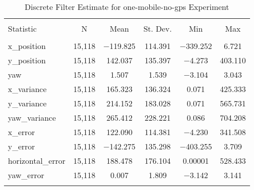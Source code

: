
\begin{table}[h] \centering 
  \caption{Discrete Filter Estimate for one-mobile-no-gps Experiment} 
  \label{tab:one_mobile_no_gps_discrete_summary} 
\begin{tabular}{@{\extracolsep{5pt}}lccccc} 
\\[-1.8ex]\hline 
\hline \\[-1.8ex] 
Statistic & \multicolumn{1}{c}{N} & \multicolumn{1}{c}{Mean} & \multicolumn{1}{c}{St. Dev.} & \multicolumn{1}{c}{Min} & \multicolumn{1}{c}{Max} \\ 
\hline \\[-1.8ex] 
x\_position & 15,118 & $-$119.825 & \num{114.391} & $-$339.252 & \num{6.721} \\ 
y\_position & 15,118 & \num{142.037} & \num{135.397} & $-$4.273 & \num{403.110} \\ 
yaw & 15,118 & \num{1.507} & \num{1.539} & $-$3.104 & \num{3.043} \\ 
x\_variance & 15,118 & \num{165.323} & \num{136.324} & \num{0.071} & \num{425.333} \\ 
y\_variance & 15,118 & \num{214.152} & \num{183.028} & \num{0.071} & \num{565.731} \\ 
yaw\_variance & 15,118 & \num{265.412} & \num{228.221} & \num{0.086} & \num{704.208} \\ 
x\_error & 15,118 & \num{122.090} & \num{114.381} & $-$4.230 & \num{341.508} \\ 
y\_error & 15,118 & $-$142.275 & \num{135.298} & $-$403.255 & \num{3.709} \\ 
horizontal\_error & 15,118 & \num{188.478} & \num{176.104} & \num{0.00001} & \num{528.433} \\ 
yaw\_error & 15,118 & \num{0.007} & \num{1.809} & $-$3.142 & \num{3.141} \\ 
\hline \\[-1.8ex] 
\end{tabular} 
\end{table} 
